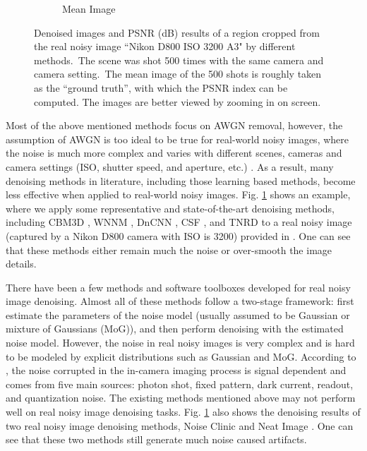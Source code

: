 \begin{figure}
\begin{subfigure}[t]{0.19\textwidth}
		\caption{Mean Image}
    \end{subfigure}
    \caption{Denoised images and PSNR (dB) results of a region cropped from the real noisy image ``Nikon D800 ISO 3200 A3" \cite{crosschannel2016} by different methods.\ The scene was shot 500 times with the same camera and camera setting.\ The mean image of the 500 shots is roughly taken as the ``ground truth'', with which the PSNR index can be computed. The images are better viewed by zooming in on screen.}
    \label{fig1}
\end{figure}

Most of the above mentioned methods focus on AWGN removal, however, the assumption of AWGN is too ideal to be true for real-world noisy images, where the noise is much more complex and varies with different scenes, cameras and camera settings (ISO, shutter speed, and aperture, etc.) \cite{crosschannel2016,healey1994radiometric}. As a result, many denoising methods in literature, including those learning based methods, become less effective when applied to real-world noisy images. Fig. \ref{fig1} shows an example, where we apply some representative and state-of-the-art denoising methods, including CBM3D \cite{cbm3d}, WNNM \cite{wnnm}, DnCNN \cite{zhang2017beyond}, CSF \cite{csf}, and TNRD \cite{chen2015learning} to a real noisy image (captured by a Nikon D800 camera with ISO is 3200) provided in \cite{crosschannel2016}. One can see that these methods either remain much the noise or over-smooth the image details.

There have been a few methods \cite{fullyblind,rabie2005robust,Liu2008,almapg,crosschannel2016,Zhu_2016_CVPR,noiseclinic,ncwebsite} and software toolboxes \cite{neatimage} developed for real noisy image denoising. Almost all of these methods follow a two-stage framework: first estimate the parameters of the noise model (usually assumed to be Gaussian or mixture of Gaussians (MoG)), and then perform denoising with the estimated noise model. However, the noise in real noisy images is very complex and is hard to be modeled by explicit distributions such as Gaussian and MoG. According to \cite{healey1994radiometric}, the noise corrupted in the in-camera imaging process \cite{tsin2001statistical,NewInCamera,crosschannel2016,karaimer_brown_ECCV_2016} is signal dependent and comes from five main sources: photon shot, fixed pattern, dark current, readout, and quantization noise. The existing methods \cite{fullyblind,rabie2005robust,Liu2008,almapg,crosschannel2016,Zhu_2016_CVPR,noiseclinic,
ncwebsite,neatimage} mentioned above may not perform well on real noisy image denoising tasks. Fig. \ref{fig1} also shows the denoising results of two real noisy image denoising methods, Noise Clinic \cite{noiseclinic,ncwebsite} and Neat Image \cite{neatimage}. One can see that these two methods still generate much noise caused artifacts. 

